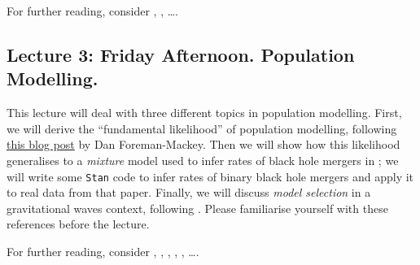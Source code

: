 \documentclass[modern]{aastex61}
\newcommand{\stan}{\texttt{Stan}}
\begin{document}
For further reading, consider \citet{Abbott2016PEPaper},
\citet{Abbott2016Wavelet}, \ldots.  

\subsection{Lecture 3: Friday Afternoon.  Population Modelling.}

This lecture will deal with three different topics in population
modelling.  First, we will derive the ``fundamental likelihood'' of
population modelling, following
\href{http://dan.iel.fm/posts/histogram1/}{this blog post} by Dan
Foreman-Mackey.  Then we will show how this likelihood generalises to
a \emph{mixture} model used to infer rates of black hole mergers in
\citet{Abbott2016Rate}; we will write some \stan{} code to infer rates
of binary black hole mergers and apply it to real data from that
paper.  Finally, we will discuss \emph{model selection} in a
gravitational waves context, following \citet{Farr2017}.  Please
familiarise yourself with these references before the lecture.

For further reading, consider \citet{Abbott2016RatesSupplement},
\citet{Foreman-Mackey2014}, \citet{Farr2015}, \citet{Loredo1995},
\citet{Farr2011}, \ldots.


\end{document}
